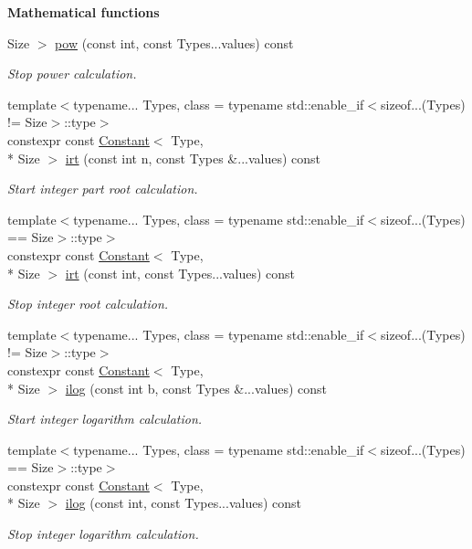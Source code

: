 \begin{Indent}{\bf Mathematical functions}
\begin{DoxyCompactItemize}
Size $>$ \hyperlink{exceptionmagrathea_1_1Constant_a62206c5dd2ba4d3f66bef0864a14c416}{pow} (const int, const Types...\-values) const 
\begin{DoxyCompactList}\small\item\em Stop power calculation. \end{DoxyCompactList}\item 
{\footnotesize template$<$typename... Types, class  = typename std\-::enable\-\_\-if$<$sizeof...(\-Types) != Size$>$\-::type$>$ }\\constexpr const \hyperlink{exceptionmagrathea_1_1Constant}{Constant}$<$ Type, \\*
Size $>$ \hyperlink{exceptionmagrathea_1_1Constant_afe40d96e2b84cea41792c2fce9577b3f}{irt} (const int n, const Types \&...values) const 
\begin{DoxyCompactList}\small\item\em Start integer part root calculation. \end{DoxyCompactList}\item 
{\footnotesize template$<$typename... Types, class  = typename std\-::enable\-\_\-if$<$sizeof...(\-Types) == Size$>$\-::type$>$ }\\constexpr const \hyperlink{exceptionmagrathea_1_1Constant}{Constant}$<$ Type, \\*
Size $>$ \hyperlink{exceptionmagrathea_1_1Constant_aabdd316e74d020d256af0725b113c6a7}{irt} (const int, const Types...\-values) const 
\begin{DoxyCompactList}\small\item\em Stop integer root calculation. \end{DoxyCompactList}\item 
{\footnotesize template$<$typename... Types, class  = typename std\-::enable\-\_\-if$<$sizeof...(\-Types) != Size$>$\-::type$>$ }\\constexpr const \hyperlink{exceptionmagrathea_1_1Constant}{Constant}$<$ Type, \\*
Size $>$ \hyperlink{exceptionmagrathea_1_1Constant_a6d57455c5403974174abd5139bb07d11}{ilog} (const int b, const Types \&...values) const 
\begin{DoxyCompactList}\small\item\em Start integer logarithm calculation. \end{DoxyCompactList}\item 
{\footnotesize template$<$typename... Types, class  = typename std\-::enable\-\_\-if$<$sizeof...(\-Types) == Size$>$\-::type$>$ }\\constexpr const \hyperlink{exceptionmagrathea_1_1Constant}{Constant}$<$ Type, \\*
Size $>$ \hyperlink{exceptionmagrathea_1_1Constant_a0f9c78ba974b0eb99dc87ee1fa6c2a8a}{ilog} (const int, const Types...\-values) const 
\begin{DoxyCompactList}\small\item\em Stop integer logarithm calculation. \end{DoxyCompactList}\end{DoxyCompactItemize}
\end{Indent}
